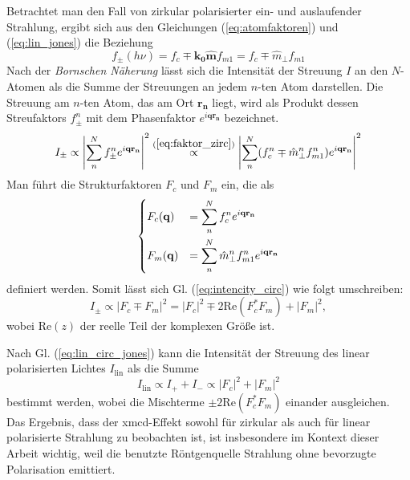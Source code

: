 \noindent
Betrachtet man den Fall von zirkular polarisierter ein- und auslaufender Strahlung, ergibt sich aus den Gleichungen (\ref{eq:atomfaktoren}) und (\ref{eq:lin_jones}) die Beziehung
\begin{equation}
    f_{\pm}(h\nu)=f_{c}\mp \mathbf{k_0}\mathbf{\hat{m}} f_{m1} = f_{c}\mp \hat{m}_\perp f_{m1}
    \label{eq:faktor_zirc}
\end{equation}
Nach der \emph{Bornschen Näherung} lässt sich die Intensität der Streuung $I$ an den $N$-Atomen als die Summe der Streuungen an jedem $n$-ten Atom darstellen. Die Streuung am $n$-ten Atom, das am Ort $\mathbf{r_n}$ liegt, wird als Produkt dessen Streufaktors $f_{\pm}^n$ mit dem Phasenfaktor $e^{i\mathbf{qr_n}}$ bezeichnet.
\begin{equation}
    I_{\pm} \propto \left| \sum_{n}^N f_{\pm}^n e^{i\mathbf{qr_n}} \right|^2 \stackrel{{(\ref{eq:faktor_zirc})}}{\propto} \left| \sum_{n}^N (f_{c}^n\mp {\hat{m}_\perp}^n f_{m1}^n) e^{i\mathbf{qr_n}} \right|^2
    \label{eq:intencity_circ}
\end{equation}
Man führt die Strukturfaktoren $F_c$ und $F_m$ ein, die als
\begin{equation}
    \begin{dcases}
     F_c(\mathbf{q}) &= \sum^N_n f_c^n e^{i\mathbf{qr_n}}\\
     F_m(\mathbf{q}) &= \sum^N_n {\hat{m}_\perp}^n f_{m1}^n e^{i\mathbf{qr_n}}
    \end{dcases}
    \label{eq:fc_fm_substitution}
\end{equation}
definiert werden. Somit lässt sich Gl. (\ref{eq:intencity_circ}) wie folgt umschreiben:
\begin{equation}
     I_{\pm} \propto \left| F_c \mp F_m \right|^2 = \left| F_c \right|^2 \mp 2\text{Re}(F_c^*F_m) + \left| F_m \right|^2,
\end{equation}
wobei $\text{Re}(z)$ der reelle Teil der komplexen Größe ist.

\noindent
Nach Gl. (\ref{eq:lin_circ_jones}) kann die Intensität der Streuung des linear polarisierten Lichtes $I_{\text{lin}}$ als die Summe
\begin{equation}
    I_{\text{lin}} \propto I_+ + I_- \propto  \left| F_c \right|^2 + \left| F_m \right|^2
\end{equation}
bestimmt werden, wobei die Mischterme $\pm2\text{Re}(F_c^*F_m)$ einander ausgleichen. Das Ergebnis, dass der \gls{xmcd}-Effekt sowohl für zirkular als auch für linear polarisierte Strahlung zu beobachten ist, ist insbesondere im Kontext dieser Arbeit wichtig, weil die benutzte Röntgenquelle Strahlung ohne bevorzugte Polarisation emittiert.

